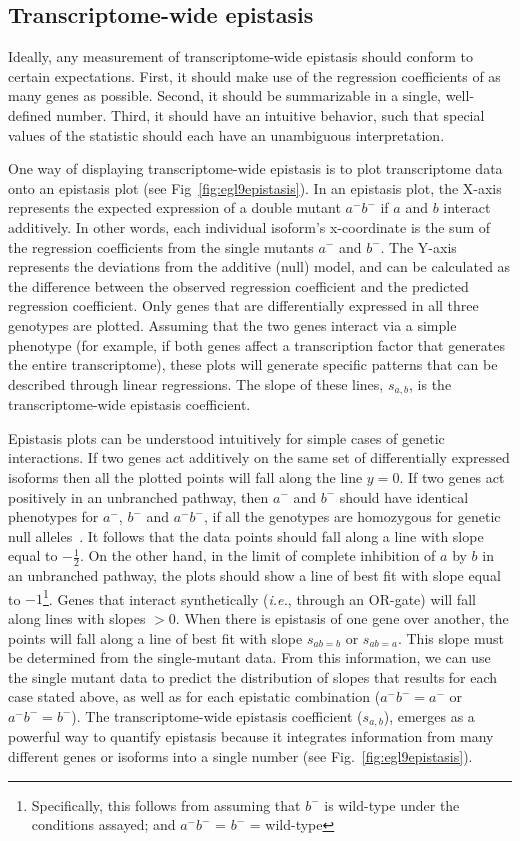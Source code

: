 \subsection*{Transcriptome-wide epistasis}
Ideally, any measurement of transcriptome-wide epistasis should conform to certain
expectations. First, it should make use of the regression coefficients of as
many genes as possible. Second, it should be summarizable in a single,
well-defined number. Third, it should have an intuitive behavior, such that
special values of the statistic should each have an unambiguous interpretation.

One way of displaying transcriptome-wide epistasis is to plot transcriptome data onto
an epistasis plot (see Fig~\ref{fig:egl9epistasis}). In an epistasis plot, the
X-axis represents the expected expression of a double mutant $a^-b^-$ if $a$
and $b$ interact additively.
In other words, each individual isoform's x-coordinate is the sum of the regression
coefficients from the single mutants $a^-$ and $b^-$.
The Y-axis represents the deviations from the additive (null) model, and
can be calculated as the difference between the observed regression coefficient
and the predicted regression coefficient. Only genes that are differentially
expressed in all three genotypes are plotted. Assuming that the two genes interact
via a simple phenotype (for example, if both genes affect a transcription factor
that generates the entire transcriptome), these plots will generate specific
patterns that can be described through linear regressions. The slope of these
lines, $s_{a,b}$, is the transcriptome-wide epistasis coefficient.

Epistasis plots can be understood intuitively for simple cases of genetic
interactions. If two genes act additively on the same set of differentially expressed
isoforms then all the plotted points will fall along the line $y=0$.
If two genes act positively in an unbranched pathway, then $a^-$ and $b^-$ should
have identical phenotypes for $a^-$, $b^-$ and $a^-b^-$, if all the genotypes are
homozygous for genetic null alleles~\citep{Huang2006}. It follows that the
data points should fall along a line with slope equal to $-\frac{1}{2}$. On the
other hand, in the limit of complete inhibition of $a$ by $b$ in an unbranched
pathway, the plots should show a line of best fit with slope equal to
$-1$\footnote{Specifically, this follows from assuming that $b^-$ is wild-type
under the conditions assayed; and $a^-b^-$ = $b^-$ = wild-type}.
Genes that interact synthetically (\emph{i.e.}, through an OR-gate) will fall
along lines with slopes $>0$. When there is epistasis of one gene over another,
the points will fall along a line of best fit with slope $s_{ab=b}$ or $s_{ab=a}$.
This slope must be determined from the single-mutant data.
From this information, we can use the single mutant data to predict the
distribution of slopes that results for each case stated above, as well as for
each epistatic combination ($a^-b^-=a^-$ or $a^-b^-=b^-$). The transcriptome-wide
epistasis coefficient ($s_{a, b}$), emerges as a powerful way to quantify epistasis
because it integrates information from many different genes or isoforms into a
single number (see Fig.~\ref{fig:egl9epistasis}).

